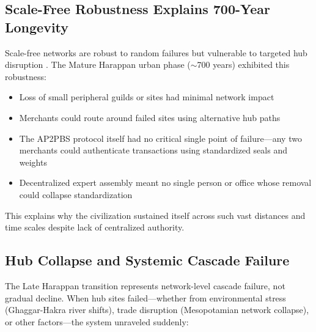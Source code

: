 \documentclass[12pt]{article}
\begin{document}
\subsection{Scale-Free Robustness Explains 700-Year Longevity}

Scale-free networks are robust to random failures but vulnerable to targeted hub
disruption \citep{albert2000error}. The Mature Harappan urban phase ($ \sim$700
years) exhibited this robustness:

\begin{itemize}
\item Loss of small peripheral guilds or sites had minimal network impact
\item Merchants could route around failed sites using alternative hub paths
\item The AP2PBS protocol itself had no critical single point of failure---any two
merchants could authenticate transactions using standardized seals and weights
\item Decentralized expert assembly meant no single person or office whose
removal could collapse standardization
\end{itemize}

This explains why the civilization sustained itself across such vast distances
and time scales despite lack of centralized authority.

\subsection{Hub Collapse and Systemic Cascade Failure}

The Late Harappan transition represents network-level cascade failure, not
gradual decline.  When hub sites failed---whether from environmental stress
(Ghaggar-Hakra river shifts), trade disruption (Mesopotamian network collapse),
or other factors---the system unraveled suddenly:
\end{document}
